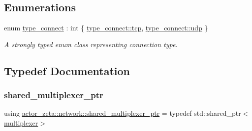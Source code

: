 \subsection*{Enumerations}
\begin{DoxyCompactItemize}
\item 
enum \hyperlink{namespaceactor__zeta_1_1network_a4046d5cb8c42554d5787ef4f0d5e3094}{type\+\_\+connect} \+: int \{ \hyperlink{namespaceactor__zeta_1_1network_a4046d5cb8c42554d5787ef4f0d5e3094ae20bb202b1d5537b1415e3263a37ed78}{type\+\_\+connect\+::tcp}, 
\hyperlink{namespaceactor__zeta_1_1network_a4046d5cb8c42554d5787ef4f0d5e3094a84864c1fe095359bc9c5ac068e24e781}{type\+\_\+connect\+::udp}
 \}\begin{DoxyCompactList}\small\item\em A strongly typed enum class representing connection type. \end{DoxyCompactList}
\end{DoxyCompactItemize}


\subsection{Typedef Documentation}
\mbox{\label{namespaceactor__zeta_1_1network_a504802c43f97832081066e4c7aeb5f24}} 
\subsubsection{\texorpdfstring{shared\+\_\+multiplexer\+\_\+ptr}{shared\_multiplexer\_ptr}}
{\footnotesize\ttfamily using \hyperlink{namespaceactor__zeta_1_1network_a504802c43f97832081066e4c7aeb5f24}{actor\+\_\+zeta\+::network\+::shared\+\_\+multiplexer\+\_\+ptr} = typedef std\+::shared\+\_\+ptr$<$\hyperlink{structactor__zeta_1_1network_1_1multiplexer}{multiplexer}$>$}

\mbox{\label{namespaceactor__zeta_1_1network_aca954f31343c8d2d513bebe30f6f87b4}} 
